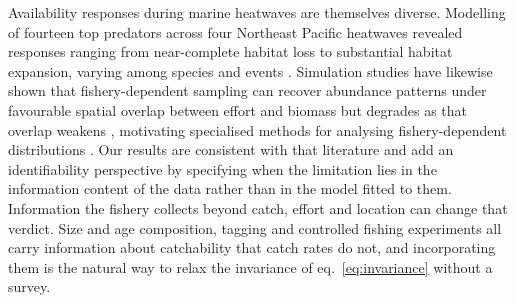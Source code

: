\documentclass[11pt,a4paper]{article}
\begin{document}
Availability responses during marine heatwaves are themselves diverse. Modelling of fourteen top predators across four Northeast Pacific heatwaves revealed responses ranging from near-complete habitat loss to substantial habitat expansion, varying among species and events \citep{welch2023}. Simulation studies have likewise shown that fishery-dependent sampling can recover abundance patterns under favourable spatial overlap between effort and biomass but degrades as that overlap weakens \citep{ducharme2022}, motivating specialised methods for analysing fishery-dependent distributions \citep{karp2023}. Our results are consistent with that literature and add an identifiability perspective by specifying when the limitation lies in the information content of the data rather than in the model fitted to them. Information the fishery collects beyond catch, effort and location can change that verdict. Size and age composition, tagging and controlled fishing experiments all carry information about catchability that catch rates do not, and incorporating them is the natural way to relax the invariance of eq.~\eqref{eq:invariance} without a survey.
\end{document}
